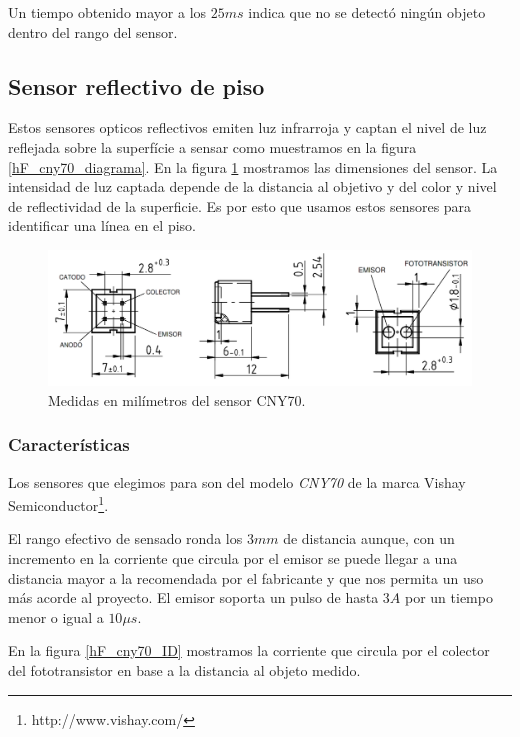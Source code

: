Un tiempo obtenido mayor a los $25ms$ indica que no se detect\'o ning\'un objeto dentro del rango del sensor.

\subsection{Sensor reflectivo de piso}
\label{h_sensado_piso}

Estos sensores opticos reflectivos emiten luz infrarroja y captan el nivel de luz reflejada sobre la superf\'icie a sensar como muestramos
en la figura \ref{hF_cny70_diagrama}.
En la figura \ref{hF_cny70_dim} mostramos las dimensiones del sensor.
La intensidad de luz captada depende de la distancia al objetivo y del color y nivel de reflectividad de la superficie.
Es por esto que usamos estos sensores para identificar una l\'inea en el piso.

\begin{figure}[ht]
	\centering
	\includegraphics[scale=0.25]{figuras/cny70_dim.png}
	\caption{Medidas en mil\'imetros del sensor CNY70.}
	\label{hF_cny70_dim}
\end{figure}

\subsubsection{Caracter\'isticas}
\label{h_sensado_piso_caracteristicas}

Los sensores que elegimos para son del modelo \emph{CNY70} de la marca Vishay Semiconductor\footnote{http://www.vishay.com/}.

El rango efectivo de sensado ronda los $3 mm$ de distancia aunque, con un incremento en la corriente que circula por el emisor
se puede llegar a una distancia mayor a la recomendada por el fabricante y que nos permita un uso m\'as acorde al proyecto.
El emisor soporta un pulso de hasta $3 A$ por un tiempo menor o igual a $10\mu s$.

En la figura \ref{hF_cny70_ID} mostramos la corriente que circula por el colector del fototransistor en base a la distancia al objeto medido.

